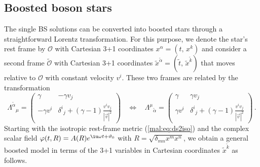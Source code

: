 \subsection{Boosted boson stars}
%
The single BS solutions can be converted into boosted stars through
a straightforward Lorentz transformation. For this purpose, we denote
the star's rest frame by $\mathcal{O}$ with Cartesian
3+1 coordinates $x^{\alpha}=(t,\,x^k)$
and consider a second frame $\tilde{\mathcal{O}}$ with Cartesian 3+1 coordinates
$\tilde{x}^{\tilde{\alpha}}=(\tilde{t},\,\tilde{x}^{\tilde{k}})$
that moves relative to $\mathcal{O}$ with
constant velocity $v^i$. These two frames are related by the transformation
%
\begin{equation}
  \Lambda^{\tilde{\alpha}}{}_{\mu} = \left( \begin{array}{c|c}
        \gamma & -\gamma v_j \\
        \hline
        -\gamma v^i & \delta^i{}_j+(\gamma-1)\frac{v^i v_j}{|\vec{v}|^2}
  \end{array} \right)~~~~\Leftrightarrow~~~~
  \Lambda^{\mu}{}_{\tilde{\alpha}} = \left( \begin{array}{c|c}
        \gamma & \gamma v_j \\
        \hline
        \gamma v^i & \delta^i{}_j+(\gamma-1)\frac{v^i v_j}{|\vec{v}|^2}
  \end{array} \right)
  \,.
  \nonumber%
\end{equation}
%
Starting with the isotropic rest-frame metric (\ref{mal:eq:ds2iso})
and the complex scalar field
$\varphi(t,R)=A(R)e^{\iu \omega t + \vartheta_0}$ with $R=\sqrt{\delta_{mn}x^mx^n}$,
we obtain a general boosted model in terms of the 3+1 variables
in Cartesian coordinates $\tilde{x}^{\tilde{k}}$ as follows.
%
